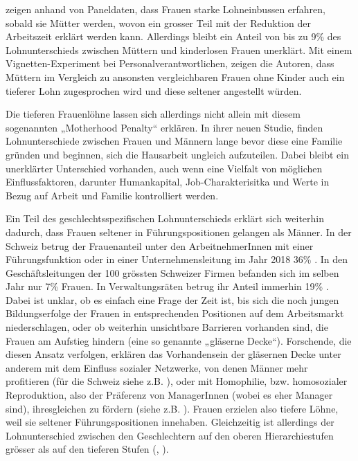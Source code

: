 \documentclass[a4paper,12pt]{article}
\begin{document}
\cite{Oesch:2017} zeigen anhand von Paneldaten, dass Frauen starke Lohneinbussen erfahren, sobald sie Mütter werden, wovon ein grosser Teil mit der Reduktion der Arbeitszeit erklärt werden kann. Allerdings bleibt ein Anteil von bis zu 9\% des Lohnunterschieds zwischen Müttern und kinderlosen Frauen unerklärt. Mit einem Vignetten-Experiment bei Personalverantwortlichen, zeigen die Autoren, dass Müttern im Vergleich zu ansonsten vergleichbaren Frauen ohne Kinder auch ein tieferer Lohn zugesprochen wird und diese seltener angestellt würden. 

Die tieferen Frauenlöhne lassen sich allerdings nicht allein mit diesem sogenannten „Motherhood Penalty“  \citep{Budig-2001} erklären. In ihrer neuen Studie, finden \cite{Combet-2019} Lohnunterschiede zwischen Frauen und Männern lange bevor diese eine Familie gründen und beginnen, sich die Hausarbeit ungleich aufzuteilen. Dabei bleibt ein unerklärter Unterschied vorhanden, auch wenn eine Vielfalt von möglichen Einflussfaktoren, darunter Humankapital, Job-Charakterisitka und Werte in Bezug auf Arbeit und Familie kontrolliert werden. 

Ein Teil des geschlechtsspezifischen Lohnunterschieds erklärt sich weiterhin dadurch, dass Frauen
seltener in Führungspositionen gelangen als Männer. In der Schweiz betrug der
Frauenanteil unter den ArbeitnehmerInnen mit einer Führungsfunktion oder in
einer Unternehmensleitung im Jahr 2018 36\% \citep{BFS-2019c}. In den
Geschäftsleitungen der 100 grössten Schweizer Firmen befanden sich im selben
Jahr nur 7\% Frauen. In Verwaltungsräten betrug ihr Anteil immerhin 19\%
\citep{Schillingreport-2018}. Dabei ist unklar, ob es einfach eine Frage der
Zeit ist, bis sich die noch jungen Bildungserfolge der Frauen in entsprechenden
Positionen auf dem Arbeitsmarkt niederschlagen, oder ob weiterhin unsichtbare
Barrieren vorhanden sind, die Frauen am Aufstieg hindern (eine so genannte
„gläserne Decke“). Forschende, die diesen Ansatz verfolgen, erklären das
Vorhandensein der gläsernen Decke unter anderem mit dem Einfluss sozialer
Netzwerke, von denen Männer mehr profitieren (für die Schweiz siehe z.B.
\citealp{Rost-2010}), oder mit Homophilie, bzw. homosozialer Reproduktion, also
der Präferenz von ManagerInnen (wobei es eher Manager sind), ihresgleichen zu
fördern (siehe z.B. \citealp{Bihagen-Ohls-2006,Holst-Wiemer-2010,Ochsenfeld-2012}). Frauen erzielen
also tiefere Löhne, weil sie seltener Führungspositionen innehaben.
Gleichzeitig ist allerdings der Lohnunterschied zwischen den Geschlechtern auf
den oberen Hierarchiestufen grösser als auf den tieferen Stufen
(\citealp{Blau-Kahn-2016}, \citealp[42]{Strub-Bannwart-2017}).
\end{document}
